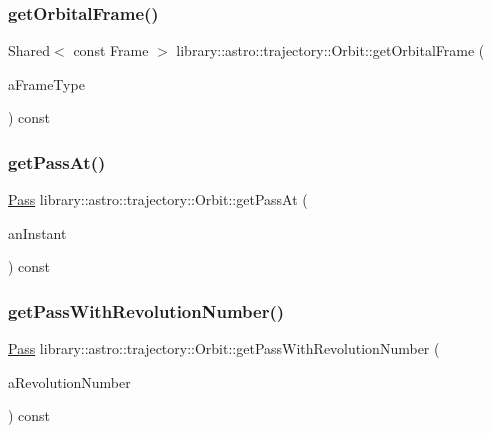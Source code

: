 \subsubsection{\texorpdfstring{get\+Orbital\+Frame()}{getOrbitalFrame()}}
{\footnotesize\ttfamily Shared$<$ const Frame $>$ library\+::astro\+::trajectory\+::\+Orbit\+::get\+Orbital\+Frame (\begin{DoxyParamCaption}\item[{const \hyperlink{classlibrary_1_1astro_1_1trajectory_1_1_orbit_a816e83a0c220d4242ce2bebd32191cd8}{Orbit\+::\+Frame\+Type} \&}]{a\+Frame\+Type }\end{DoxyParamCaption}) const}

\mbox{\label{classlibrary_1_1astro_1_1trajectory_1_1_orbit_afea348a49c2844ada41cc35f05851b77}} 
\subsubsection{\texorpdfstring{get\+Pass\+At()}{getPassAt()}}
{\footnotesize\ttfamily \hyperlink{classlibrary_1_1astro_1_1trajectory_1_1orbit_1_1_pass}{Pass} library\+::astro\+::trajectory\+::\+Orbit\+::get\+Pass\+At (\begin{DoxyParamCaption}\item[{const Instant \&}]{an\+Instant }\end{DoxyParamCaption}) const}

\mbox{\label{classlibrary_1_1astro_1_1trajectory_1_1_orbit_a08833197c8d3774bf4436c1fb68c77ae}} 
\subsubsection{\texorpdfstring{get\+Pass\+With\+Revolution\+Number()}{getPassWithRevolutionNumber()}}
{\footnotesize\ttfamily \hyperlink{classlibrary_1_1astro_1_1trajectory_1_1orbit_1_1_pass}{Pass} library\+::astro\+::trajectory\+::\+Orbit\+::get\+Pass\+With\+Revolution\+Number (\begin{DoxyParamCaption}\item[{const Integer \&}]{a\+Revolution\+Number }\end{DoxyParamCaption}) const}

